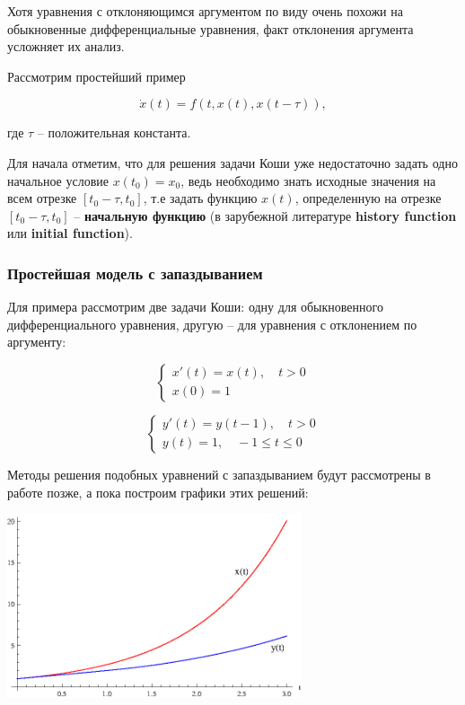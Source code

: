 Хотя уравнения с отклоняющимся аргументом по виду очень похожи на обыкновенные дифференциальные уравнения, факт отклонения аргумента усложняет их анализ.

Рассмотрим простейший пример

\begin{equation}\label{eq:example}
\dot{x}(t) = f(t,x(t),x(t-\tau)),
\end{equation}

где $\tau$ \--- положительная константа.

Для начала отметим, что для решения задачи Коши уже недостаточно задать одно начальное условие $x(t_0)=x_0$, ведь необходимо знать исходные значения на всем отрезке $[t_0-\tau,t_0]$, т.е задать функцию $x(t)$, определенную на отрезке $[t_0-\tau,t_0]$ \--- \textbf{начальную функцию} (в зарубежной литературе \textbf{history function} или \textbf{initial function}).

\subsubsection{Простейшая модель с запаздыванием}

Для примера рассмотрим две задачи Коши: одну для обыкновенного дифференциального уравнения, другую \--- для уравнения с отклонением по аргументу:

\begin{equation}\label{eq:no-delay}
\left\{
\begin{aligned}
x'(t) = x(t), \quad t>0\\
x(0) = 1
\end{aligned}
\right.
\end{equation}

\begin{equation}\label{eq:delay}
\left\{
\begin{aligned}
y'(t) = y(t-1), \quad t>0\\
y(t) = 1, \quad -1 \leq t \leq 0
\end{aligned}
\right.
\end{equation}

Методы решения подобных уравнений с запаздыванием будут рассмотрены в работе позже, а пока построим графики этих решений:

\begin{center}
\includegraphics[width=0.65\textwidth]{./1_modelling/comparison.eps}
\end{center}

